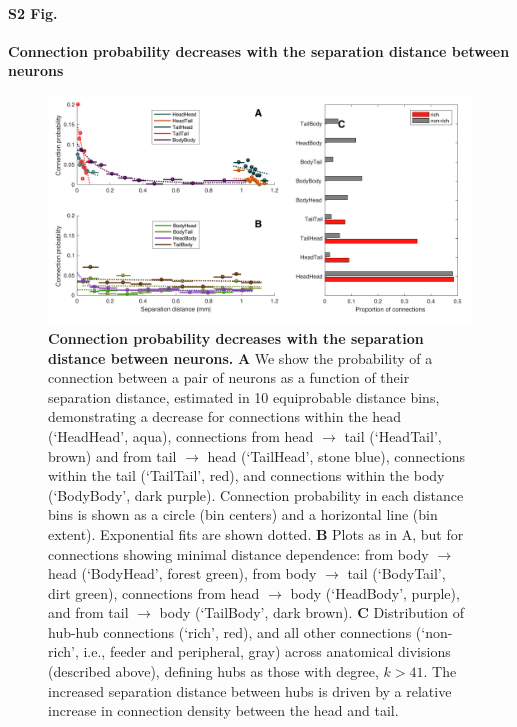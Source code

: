 \documentclass[10pt,letterpaper]{article}
\begin{document}
\paragraph*{S2 Fig.}
{\bf Connection probability decreases with the separation distance between neurons}
\begin{figure}[h]
\centering
    \includegraphics[width=1\textwidth]{ConnectionProbability.pdf}
\caption{
\label{fig:S_connProbability}
\textbf{Connection probability decreases with the separation distance between neurons.}
\textbf{A}
We show the probability of a connection between a pair of neurons as a function of their separation distance, estimated in 10 equiprobable distance bins, demonstrating a decrease for connections within the head (`HeadHead', aqua), connections from head $\rightarrow$ tail (`HeadTail', brown) and from tail $\rightarrow$ head (`TailHead', stone blue), connections within the tail (`TailTail', red), and connections within the body (`BodyBody', dark purple).
Connection probability in each distance bins is shown as a circle (bin centers) and a horizontal line (bin extent).
Exponential fits are shown dotted.
\textbf{B}
Plots as in A, but for connections showing minimal distance dependence: from body $\rightarrow$ head (`BodyHead', forest green), from body $\rightarrow$ tail (`BodyTail', dirt green), connections from head $\rightarrow$ body (`HeadBody', purple), and from tail $\rightarrow$ body (`TailBody', dark brown).
\textbf{C}
Distribution of hub-hub connections (`rich', red), and all other connections (`non-rich', i.e., feeder and peripheral, gray) across anatomical divisions (described above), defining hubs as those with degree, $k > 41$.
The increased separation distance between hubs is driven by a relative increase in connection density between the head and tail.
}
\end{figure}
\end{document}
